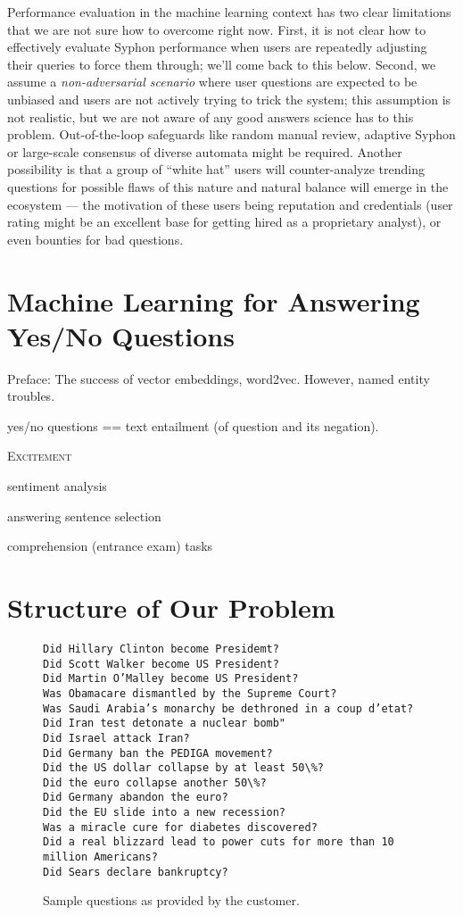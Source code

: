 \documentclass[11pt,a4paper]{article}
\begin{document}
Performance evaluation in the machine learning context has two clear limitations
that we are not sure how to overcome right now.  First, it is not clear how to
effectively evaluate Syphon performance when users are repeatedly adjusting
their queries to force them through; we'll come back to this below.
Second, we assume a \textit{non-adversarial scenario} where user questions
are expected to be unbiased and users are not actively trying to trick the system;
this assumption is not realistic, but we are not aware of any good answers science
has to this problem.  Out-of-the-loop safeguards like random manual review,
adaptive Syphon or large-scale consensus of diverse automata might be required.
Another possibility is that a group of ``white hat'' users will counter-analyze
trending questions for possible flaws of this nature and natural balance will
emerge in the ecosystem --- the motivation of these users being reputation and
credentials (user rating might be an excellent base for getting hired as a
proprietary analyst), or even bounties for bad questions.

\section{Machine Learning for Answering Yes/No Questions}
\label{ynml}

Preface: The success of vector embeddings, word2vec.
However, named entity troubles.

yes/no questions == text entailment (of question and its negation).

\textsc{Excitement}

sentiment analysis

answering sentence selection

comprehension (entrance exam) tasks

\section{Structure of Our Problem}
\label{structure}

\begin{figure}
\begin{verbatim}
Did Hillary Clinton become Presidemt?
Did Scott Walker become US President?
Did Martin O’Malley become US President?
Was Obamacare dismantled by the Supreme Court?
Was Saudi Arabia’s monarchy be dethroned in a coup d’etat?
Did Iran test detonate a nuclear bomb"
Did Israel attack Iran?
Did Germany ban the PEDIGA movement?
Did the US dollar collapse by at least 50\%?
Did the euro collapse another 50\%?
Did Germany abandon the euro?
Did the EU slide into a new recession?
Was a miracle cure for diabetes discovered?
Did a real blizzard lead to power cuts for more than 10 million Americans?
Did Sears declare bankruptcy?
\end{verbatim}
	\caption{Sample questions as provided by the customer.}
	\label{fig:sampleq}
\end{figure}
\end{document}
